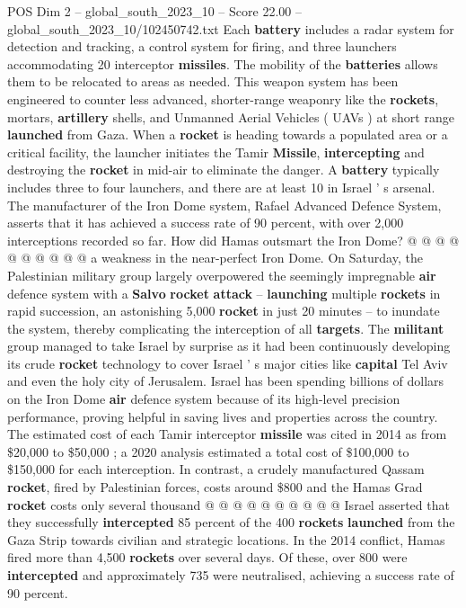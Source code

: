 \begin{textsample}{POS Dim 2 – global\_south\_2023\_10 – Score 22.00 – global\_south\_2023\_10/102450742.txt}
Each \textbf{battery} includes a radar system for detection and tracking, a control system for firing, and three launchers accommodating 20 interceptor \textbf{missiles}.
The mobility of the \textbf{batteries} allows them to be relocated to areas as needed.
This weapon system has been engineered to counter less advanced, shorter-range weaponry like the \textbf{rockets}, mortars, \textbf{artillery} shells, and Unmanned Aerial Vehicles ( UAVs ) at short range \textbf{launched} from Gaza.
When a \textbf{rocket} is heading towards a populated area or a critical facility, the launcher initiates the Tamir \textbf{Missile}, \textbf{intercepting} and destroying the \textbf{rocket} in mid-air to eliminate the danger.
A \textbf{battery} typically includes three to four launchers, and there are at least 10 in Israel ' s arsenal.
The manufacturer of the Iron Dome system, Rafael Advanced Defence System, asserts that it has achieved a success rate of 90 percent, with over 2,000 interceptions recorded so far.
How did Hamas outsmart the Iron Dome? @ @ @ @ @ @ @ @ @ @ a weakness in the near-perfect Iron Dome.
On Saturday, the Palestinian military group largely overpowered the seemingly impregnable \textbf{air} defence system with a \textbf{Salvo} \textbf{rocket} \textbf{attack} -- \textbf{launching} multiple \textbf{rockets} in rapid succession, an astonishing 5,000 \textbf{rocket} in just 20 minutes -- to inundate the system, thereby complicating the interception of all \textbf{targets}.
The \textbf{militant} group managed to take Israel by surprise as it had been continuously developing its crude \textbf{rocket} technology to cover Israel ' s major cities like \textbf{capital} Tel Aviv and even the holy city of Jerusalem.
Israel has been spending billions of dollars on the Iron Dome \textbf{air} defence system because of its high-level precision performance, proving helpful in saving lives and properties across the country.
The estimated cost of each Tamir interceptor \textbf{missile} was cited in 2014 as from \$20,000 to \$50,000 ; a 2020 analysis estimated a total cost of \$100,000 to \$150,000 for each interception.
In contrast, a crudely manufactured Qassam \textbf{rocket}, fired by Palestinian forces, costs around \$800 and the Hamas Grad \textbf{rocket} costs only several thousand @ @ @ @ @ @ @ @ @ @ Israel asserted that they successfully \textbf{intercepted} 85 percent of the 400 \textbf{rockets} \textbf{launched} from the Gaza Strip towards civilian and strategic locations.
In the 2014 conflict, Hamas fired more than 4,500 \textbf{rockets} over several days.
Of these, over 800 were \textbf{intercepted} and approximately 735 were neutralised, achieving a success rate of 90 percent.

\end{textsample}
